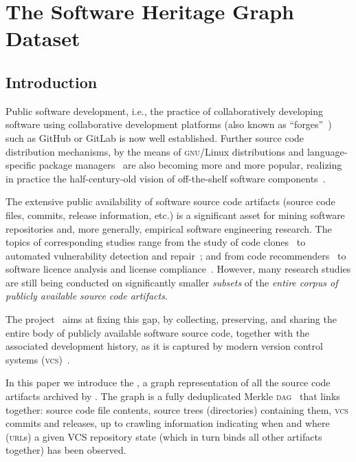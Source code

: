 \chapter{The Software Heritage Graph Dataset}

\section{Introduction}
\label{sec:intro}

Public software development, i.e., the practice of collaboratively developing
software using collaborative development platforms (also known as
``forges''~\cite{DBLP:conf/wikis/Squire17}) such as GitHub or GitLab is now
well established. Further source code distribution mechanisms, by the means of
\textsc{gnu}/Linux distributions and language-specific package
managers~\cite{DBLP:conf/msr/KikasGDP17, DBLP:conf/msr/AbateCGFTZ15} are also
becoming more and more popular, realizing in practice the half-century-old
vision of off-the-shelf software components~\cite{mcilroy1968mass,Spi07a}.

The extensive public availability of software source code artifacts (source code
files, commits, release information, etc.) is a significant asset for mining
software repositories and, more generally, empirical software engineering
research.
The topics of corresponding studies range from the study of code
clones~\cite{SvajlenkoR17, SemuraYCI17, ThummalapentaCAP10} to automated
vulnerability detection and repair~\cite{Li2017, Grieco2016, MartinezM15};
and from
code recommenders~\cite{Zeller2007, ZimmermannWDZ04} to software licence
analysis and license compliance~\cite{GermanLicense17, VendomeLicence2015}.
However, many research studies are still being conducted on
significantly smaller \emph{subsets} of the \emph{entire corpus of publicly
  available source code artifacts}.

The \SWH project~\cite{cacm-2018-software-heritage,
  ipres-2017-software-heritage} aims at fixing this gap, by collecting,
preserving, and sharing the entire body of publicly available software source
code, together with the associated development history, as it is captured by
modern version control systems (\textsc{vcs})~\cite{spinellis2005version}.

In this paper we introduce the \emph{\SWHGD}, a graph representation of all the
source code artifacts archived by \SWH{}. The graph is a fully deduplicated
Merkle \textsc{dag}~\cite{Merkle} that links together: source code file contents, source
trees (directories) containing them, \textsc{vcs} commits and releases, up to crawling
information indicating when and where (\textsc{url}s) a given VCS repository state
(which in turn binds all other artifacts together) has been observed.

